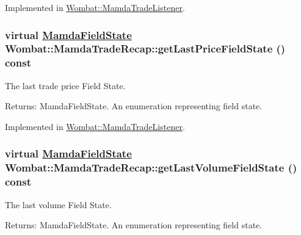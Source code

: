 Implemented in \hyperlink{classWombat_1_1MamdaTradeListener_8d5969ac94475afb4eeeb8b252106e6f}{Wombat::Mamda\-Trade\-Listener}.\hypertarget{classWombat_1_1MamdaTradeRecap_f4508406463e09aab15652b4b30b0bbc}{
\subsubsection[getLastPriceFieldState]{\setlength{\rightskip}{0pt plus 5cm}virtual \hyperlink{namespaceWombat_93aac974f2ab713554fd12a1fa3b7d2a}{Mamda\-Field\-State} Wombat::Mamda\-Trade\-Recap::get\-Last\-Price\-Field\-State () const}}
\label{classWombat_1_1MamdaTradeRecap_f4508406463e09aab15652b4b30b0bbc}


The last trade price Field State. 

\begin{Desc}
\item[Returns:]Mamda\-Field\-State. An enumeration representing field state. \end{Desc}


Implemented in \hyperlink{classWombat_1_1MamdaTradeListener_1374642c578867d0b51dff83e5b2a99f}{Wombat::Mamda\-Trade\-Listener}.\hypertarget{classWombat_1_1MamdaTradeRecap_71887b4616edf5af0fccc2bae90a607c}{
\subsubsection[getLastVolumeFieldState]{\setlength{\rightskip}{0pt plus 5cm}virtual \hyperlink{namespaceWombat_93aac974f2ab713554fd12a1fa3b7d2a}{Mamda\-Field\-State} Wombat::Mamda\-Trade\-Recap::get\-Last\-Volume\-Field\-State () const}}
\label{classWombat_1_1MamdaTradeRecap_71887b4616edf5af0fccc2bae90a607c}


The last volume Field State. 

\begin{Desc}
\item[Returns:]Mamda\-Field\-State. An enumeration representing field state. \end{Desc}


